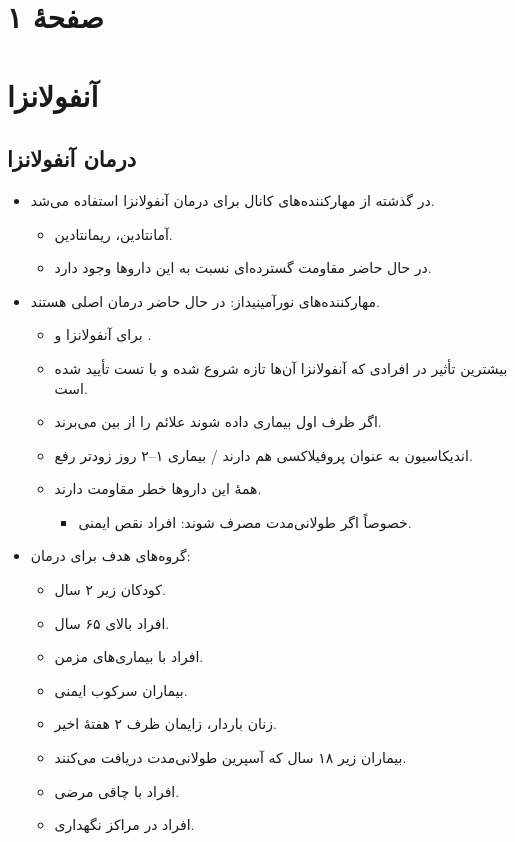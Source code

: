 \documentclass[12pt,a4paper]{article}
\providecommand{\en}[1]{\lr{#1}}
\newcommand{\influpage}[1]{\clearpage\section*{صفحهٔ #1}%
  {\footnotesize\en{No \ldots\quad Date \ldots}\par}}
\begin{document}
\fi

\influpage{۱}
\section*{آنفولانزا}
\subsection*{درمان آنفولانزا}
\begin{itemize}
\item در گذشته از مهارکننده‌های کانال \en{M-2} برای درمان آنفولانزا \en{A} استفاده می‌شد.
  \begin{itemize}
  \item آمانتادین، ریمانتادین.
  \item در حال حاضر مقاومت گسترده‌ای نسبت به این داروها وجود دارد.
  \end{itemize}
\item مهارکننده‌های نورآمینیداز: در حال حاضر درمان اصلی هستند.
  \begin{itemize}
  \item برای آنفولانزا \en{A} و \en{B}.
  \item بیشترین تأثیر در افرادی که آنفولانزا آن‌ها تازه شروع شده و با تست تأیید شده است.
  \item اگر ظرف \en{48 h} اول بیماری داده شوند علائم را از بین می‌برند.
  \item اندیکاسیون به عنوان پروفیلاکسی هم دارند / بیماری ۱--۲ روز زودتر رفع.
  \item همهٔ این داروها خطر مقاومت دارند.
    \begin{itemize}
    \item خصوصاً اگر طولانی‌مدت مصرف شوند: افراد نقص ایمنی.
    \end{itemize}
  \end{itemize}
\item گروه‌های هدف برای درمان:
  \begin{itemize}
  \item کودکان زیر ۲ سال.
  \item افراد بالای ۶۵ سال.
  \item افراد با بیماری‌های مزمن.
  \item بیماران سرکوب ایمنی.
  \item زنان باردار، زایمان ظرف ۲ هفتهٔ اخیر.
  \item بیماران زیر ۱۸ سال که آسپرین طولانی‌مدت دریافت می‌کنند.
  \item افراد با چاقی مرضی.
  \item افراد در مراکز نگهداری.
  \end{itemize}

\end{itemize}
\end{document}
